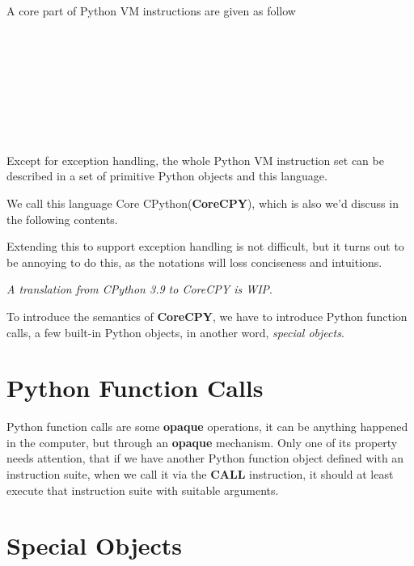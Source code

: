 \documentclass[12pt, a4paper]{report}
\begin{document}
A core part of Python VM instructions are given as follow

\begin{bnf*}
     \\
    \\
    \\
    \\
    \\
    \\
     \\
\end{bnf*}


Except for exception handling, the whole Python VM instruction set can be described in
a set of primitive Python objects and this language.

We call this language Core CPython(\textbf{CoreCPY}), which is also we'd discuss in the following contents.

Extending this to support exception handling is not difficult,
but it turns out to be annoying to do this,
as the notations will loss conciseness and intuitions.

\textit{A translation from CPython 3.9 to CoreCPY is WIP}.

To introduce the semantics of \textbf{CoreCPY},
we have to introduce Python function calls,
a few built-in Python objects, in another word, \textit{special objects}.

\section* {Python Function Calls}

Python function calls are some \textbf{opaque} operations,
it can be anything happened in the computer, but through an \textbf{opaque} mechanism.
Only one of its property needs attention,
that if we have another Python function object defined with an instruction suite,
when we call it via the \textbf{CALL} instruction,
it should at least execute that instruction suite with suitable arguments.

\section* {Special Objects}
\end{document}
